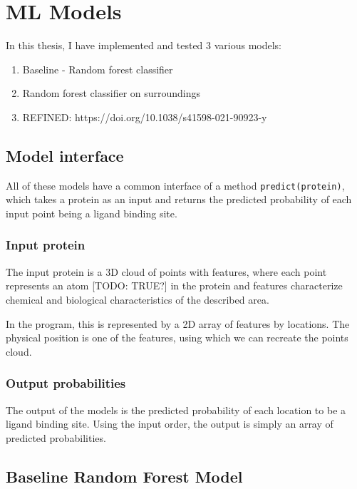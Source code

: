 \chapter{ML Models}

In this thesis, I have implemented and tested 3 various models:
\begin{enumerate}
    \item Baseline - Random forest classifier
    \item Random forest classifier on surroundings
    \item REFINED: https://doi.org/10.1038/s41598-021-90923-y
    
\end{enumerate}

\section{Model interface}

All of these models have a common interface of a method  \texttt{predict(protein)}, which takes a protein as an input and returns the predicted probability of each input point being a ligand binding site.

\subsection{Input protein}

The input protein is a 3D cloud of points with features, where each point represents an atom [TODO: TRUE?] in the protein and features characterize chemical and biological characteristics of the described area.

In the program, this is represented by a 2D array of features by locations. The physical position is one of the features, using which we can recreate the points cloud.

\subsection{Output probabilities}

The output of the models is the predicted probability of each location to be a ligand binding site. Using the input order, the output is simply an array of predicted probabilities.

\section{Baseline Random Forest Model}

